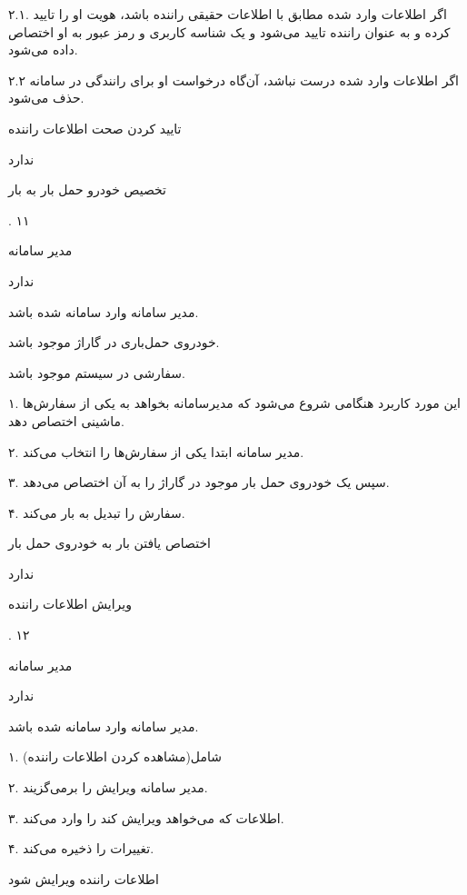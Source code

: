 ۲.۱. اگر اطلاعات وارد شده مطابق با اطلاعات حقیقی راننده باشد، هویت او را تایید کرده و به عنوان راننده تایید می‌شود و یک شناسه کاربری و رمز عبور به او اختصاص داده می‌شود.

۲.۲ اگر اطلاعات وارد شده درست نباشد، آن‌گاه درخواست او برای رانندگی در سامانه حذف می‌شود.

تایید کردن صحت اطلاعات راننده

ندارد

\noindent \hrulefill

تخصیص خودرو حمل بار به بار

.
۱۱

مدیر سامانه

ندارد


مدیر سامانه وارد سامانه شده باشد. 

خودروی حمل‌باری در گاراژ موجود باشد.

سفارشی در سیستم موجود باشد.


۱. این مورد کاربرد هنگامی شروع می‌شود که مدیرسامانه بخواهد به یکی از سفارش‌ها ماشینی اختصاص دهد.

۲. مدیر سامانه ابتدا یکی از سفارش‌ها را انتخاب می‌کند.

۳. سپس یک خودروی حمل بار موجود در گاراژ را به آن اختصاص می‌دهد.

۴. سفارش را تبدیل به بار می‌کند.

اختصاص یافتن بار به خودروی حمل بار

ندارد

\noindent \hrulefill

ویرایش اطلاعات راننده

.
۱۲

مدیر سامانه

ندارد

مدیر سامانه وارد سامانه شده باشد.


۱. شامل(مشاهده کردن اطلاعات راننده)

۲. مدیر سامانه ویرایش را برمی‌گزیند.

۳. اطلاعات که می‌خواهد ویرایش کند را وارد می‌کند.

۴. تغییرات را ذخیره می‌کند.

اطلاعات راننده ویرایش شود

